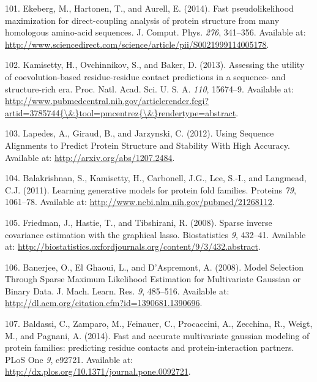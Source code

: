 \documentclass[11pt,a4paper,twoside]{book}
\theoremstyle{definition}
\theoremstyle{definition}
\theoremstyle{remark}
\begin{document}
\hypertarget{ref-Ekeberg2014}{}
101. Ekeberg, M., Hartonen, T., and Aurell, E. (2014). Fast
pseudolikelihood maximization for direct-coupling analysis of protein
structure from many homologous amino-acid sequences. J. Comput. Phys.
\emph{276}, 341--356. Available at:
\url{http://www.sciencedirect.com/science/article/pii/S0021999114005178}.

\hypertarget{ref-Kamisetty2013}{}
102. Kamisetty, H., Ovchinnikov, S., and Baker, D. (2013). Assessing the
utility of coevolution-based residue-residue contact predictions in a
sequence- and structure-rich era. Proc. Natl. Acad. Sci. U. S. A.
\emph{110}, 15674--9. Available at:
\href{http://www.pubmedcentral.nih.gov/articlerender.fcgi?artid=3785744\%7B/\&\%7Dtool=pmcentrez\%7B/\&\%7Drendertype=abstract}{http://www.pubmedcentral.nih.gov/articlerender.fcgi?artid=3785744\{\textbackslash{}\&\}tool=pmcentrez\{\textbackslash{}\&\}rendertype=abstract}.

\hypertarget{ref-Lapedes2012a}{}
103. Lapedes, A., Giraud, B., and Jarzynski, C. (2012). Using Sequence
Alignments to Predict Protein Structure and Stability With High
Accuracy. Available at: \url{http://arxiv.org/abs/1207.2484}.

\hypertarget{ref-Balakrishnan2011}{}
104. Balakrishnan, S., Kamisetty, H., Carbonell, J.G., Lee, S.-I., and
Langmead, C.J. (2011). Learning generative models for protein fold
families. Proteins \emph{79}, 1061--78. Available at:
\url{http://www.ncbi.nlm.nih.gov/pubmed/21268112}.

\hypertarget{ref-Friedman2008}{}
105. Friedman, J., Hastie, T., and Tibshirani, R. (2008). Sparse inverse
covariance estimation with the graphical lasso. Biostatistics \emph{9},
432--41. Available at:
\url{http://biostatistics.oxfordjournals.org/content/9/3/432.abstract}.

\hypertarget{ref-Banerjee2008}{}
106. Banerjee, O., El Ghaoui, L., and D'Aspremont, A. (2008). Model
Selection Through Sparse Maximum Likelihood Estimation for Multivariate
Gaussian or Binary Data. J. Mach. Learn. Res. \emph{9}, 485--516.
Available at: \url{http://dl.acm.org/citation.cfm?id=1390681.1390696}.

\hypertarget{ref-Baldassi2014}{}
107. Baldassi, C., Zamparo, M., Feinauer, C., Procaccini, A., Zecchina,
R., Weigt, M., and Pagnani, A. (2014). Fast and accurate multivariate
gaussian modeling of protein families: predicting residue contacts and
protein-interaction partners. PLoS One \emph{9}, e92721. Available at:
\url{http://dx.plos.org/10.1371/journal.pone.0092721}.
\end{document}
